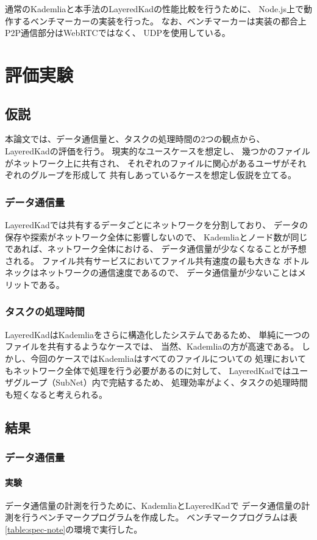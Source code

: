 \documentclass[sotsuron]{jcsie}
\begin{document}
通常のKademliaと本手法のLayeredKadの性能比較を行うために、
Node.js上で動作するベンチマーカーの実装を行った。
なお、ベンチマーカーは実装の都合上P2P通信部分はWebRTCではなく、
UDPを使用している。

\chapter{評価実験}
\section{仮説}
本論文では、データ通信量と、タスクの処理時間の2つの観点から、
LayeredKadの評価を行う。
現実的なユースケースを想定し、
幾つかのファイルがネットワーク上に共有され、
それぞれのファイルに関心があるユーザがそれぞれのグループを形成して
共有しあっているケースを想定し仮説を立てる。
\subsection{データ通信量}
LayeredKadでは共有するデータごとにネットワークを分割しており、
データの保存や探索がネットワーク全体に影響しないので、
Kademliaとノード数が同じであれば、ネットワーク全体における、
データ通信量が少なくなることが予想される。
ファイル共有サービスにおいてファイル共有速度の最も大きな
ボトルネックはネットワークの通信速度であるので、
データ通信量が少ないことはメリットである。
\subsection{タスクの処理時間}
LayeredKadはKademliaをさらに構造化したシステムであるため、
単純に一つのファイルを共有するようなケースでは、
当然、Kademliaの方が高速である。
しかし、今回のケースではKademliaはすべてのファイルについての
処理においてもネットワーク全体で処理を行う必要があるのに対して、
LayeredKadではユーザグループ（SubNet）内で完結するため、
処理効率がよく、タスクの処理時間も短くなると考えられる。

\section{結果}
\subsection{データ通信量}
\subsubsection{実験}
データ通信量の計測を行うために、KademliaとLayeredKadで
データ通信量の計測を行うベンチマークプログラムを作成した。
ベンチマークプログラムは表\ref{table:spec-note}の環境で実行した。
\end{document}
